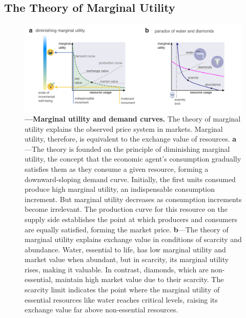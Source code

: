\documentclass[./main_en.tex]{subfiles}
\begin{document}
\subsection{The Theory of Marginal Utility} \label{subsec:marginutil}

\begin{figure}[t!] 
\centering				
\includegraphics[width=0.98\linewidth]{figs/fig_marginalutil_en.jpg}		
\caption[Marginal Utility and Demand Curves]
{\textbf{---\;Marginal utility and demand curves.}
    The theory of marginal utility explains the observed price system in markets. Marginal utility, therefore, is equivalent to the exchange value of resources. 
    \;\textbf{a}\;---\;The theory is founded on the principle of diminishing marginal utility, the concept that the economic agent’s consumption gradually satisfies them as they consume a given resource, forming a downward-sloping demand curve. Initially, the first units consumed produce high marginal utility, an indispensable consumption increment. But marginal utility decreases as consumption increments become irrelevant. The production curve for this resource on the supply side establishes the point at which producers and consumers are equally satisfied, forming the market price.
    \;\textbf{b}\;---\;The theory of marginal utility explains exchange value in conditions of scarcity and abundance. Water, essential to life, has low marginal utility and market value when abundant, but in scarcity, its marginal utility rises, making it valuable. In contrast, diamonds, which are non-essential, maintain high market value due to their scarcity. The scarcity limit indicates the point where the marginal utility of essential resources like water reaches critical levels, raising its exchange value far above non-essential resources.
}
\label{fig:eco:marginutil} 		
\end{figure}
\end{document}
